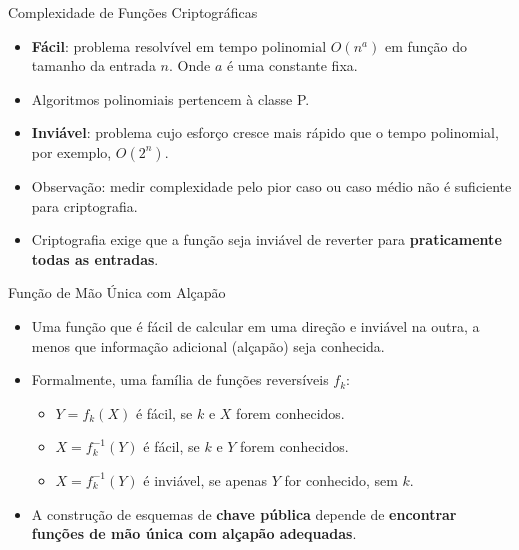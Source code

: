 \begin{frame}{Complexidade de Funções Criptográficas}
  \begin{itemize}
    \item \textbf{Fácil}: problema resolvível em tempo polinomial $O(n^a)$ em função do tamanho da entrada $n$. Onde $a$ é uma constante fixa.
    \item Algoritmos polinomiais pertencem à classe P.
    \item \textbf{Inviável}: problema cujo esforço cresce mais rápido que o tempo polinomial, por exemplo, $O(2^n)$.
    \item Observação: medir complexidade pelo pior caso ou caso médio não é suficiente para criptografia.
    \item Criptografia exige que a função seja inviável de reverter para \textbf{praticamente todas as entradas}.
  \end{itemize}
\end{frame}
\begin{frame}{Função de Mão Única com Alçapão}
  \begin{itemize}
    \item Uma função que é fácil de calcular em uma direção e inviável na outra, a menos que informação adicional (alçapão) seja conhecida.
    \item Formalmente, uma família de funções reversíveis $f_k$:
          \begin{itemize}
            \item $Y = f_k(X)$ é fácil, se $k$ e $X$ forem conhecidos.
            \item $X = f_k^{-1}(Y)$ é fácil, se $k$ e $Y$ forem conhecidos.
            \item $X = f_k^{-1}(Y)$ é inviável, se apenas $Y$ for conhecido, sem $k$.
          \end{itemize}
    \item A construção de esquemas de \textbf{chave pública} depende de \textbf{encontrar funções de mão única com alçapão adequadas}.
  \end{itemize}
\end{frame}

